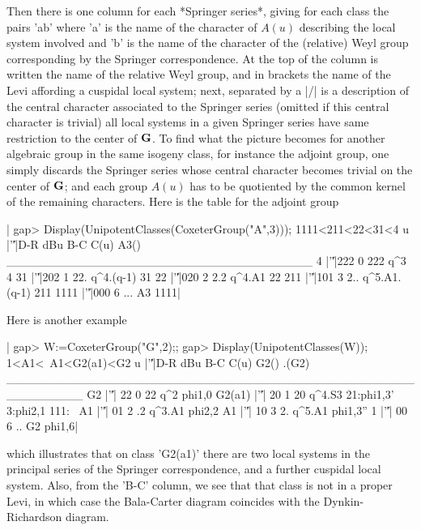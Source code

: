 Then  there is one column for each *Springer series*, giving for each class
the  pairs  'a\:b'  where  'a'  is  the  name  of  the  character of $A(u)$
describing  the local system involved and 'b'  is the name of the character
of  the (relative) Weyl group corresponding by the Springer correspondence.
At  the top of the  column is written the  name of the relative Weyl group,
and  in brackets the  name of the  Levi affording a  cuspidal local system;
next,  separated  by  a  |/|  is  a  description  of  the central character
associated  to the  Springer series  (omitted if  this central character is
trivial)\:  all  local  systems  in  a  given  Springer  series  have  same
restriction  to the center of  ${\bf G}$. To find what  the picture becomes for
another algebraic group in the same isogeny class, for instance the adjoint
group,  one  simply  discards  the  Springer series whose central character
becomes  trivial on the  center of ${\bf G}$;  and each group  $A(u)$ has to be
quotiented  by the common  kernel of the  remaining characters. Here is the
table for the adjoint group\:

|    gap> Display(UnipotentClasses(CoxeterGroup("A",3))); 
    1111<211<22<31<4
       u |'\|'|D-R dBu B-C         C(u) A3()
    ____________________________________
    4    |'\|'|222   0 222          q^3    4
    31   |'\|'|202   1 22.    q^4.(q-1)   31
    22   |'\|'|020   2 2.2       q^4.A1   22
    211  |'\|'|101   3 2.. q^5.A1.(q-1)  211
    1111 |'\|'|000   6 ...           A3 1111|

Here is another example\:

|    gap> W:=CoxeterGroup("G",2);; 
    gap> Display(UnipotentClasses(W)); 
    1<A1<~A1<G2(a1)<G2
         u |'\|'|D-R dBu B-C       C(u)                    G2() .(G2)
    _________________________________________________________
    G2     |'\|'| 22   0  22    q^2                phi{1,0}      
    G2(a1) |'\|'| 20   1  20 q^4.S3 21:phi{1,3}' 3:phi{2,1}  111:
    ~A1    |'\|'| 01   2  .2 q^3.A1                phi{2,2}      
    A1     |'\|'| 10   3  2. q^5.A1              phi{1,3}''      
    1      |'\|'| 00   6  ..     G2                phi{1,6}|

which illustrates that on class 'G2(a1)' there are two local systems in the
principal  series of  the Springer  correspondence, and  a further cuspidal
local system. Also, from the 'B-C' column, we see that that class is not in
a  proper Levi,  in which  case the  Bala-Carter diagram coincides with the
Dynkin-Richardson diagram.

